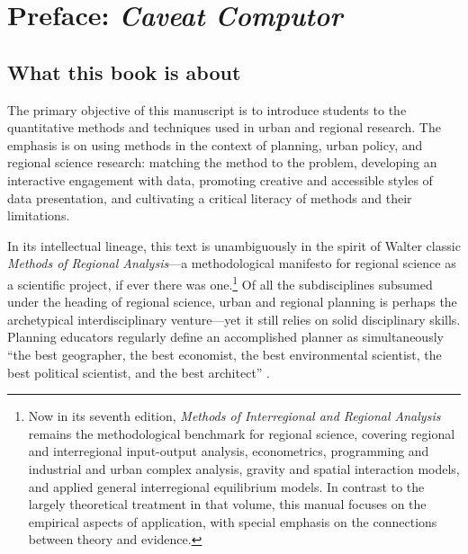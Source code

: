 
\chapter*{Preface: \textit{Caveat Computor}}\label{chap_Preface}

\section*{What this book is about}

The primary objective of this manuscript is to introduce students to the
quantitative methods and techniques used in urban and regional research. The
emphasis is on using methods in the context of planning, urban policy, and
regional science research: matching the method to the problem, developing an
interactive engagement with data, promoting creative and accessible styles of
data presentation, and cultivating a critical literacy of methods and their
limitations.

In its intellectual lineage, this text is unambiguously in the spirit of
Walter  classic \emph{Methods of Regional Analysis}---a
methodological manifesto for regional science as a scientific project, if ever
there was one.\footnote{Now in its seventh edition, \emph{Methods of
Interregional and Regional Analysis} \citep{Isard1998} remains the
methodological benchmark for regional science, covering regional and
interregional input-output analysis, econometrics, programming and industrial
and urban complex analysis, gravity and spatial interaction models, and applied
general interregional equilibrium models. In contrast to the largely
theoretical treatment in that volume, this manual focuses on the empirical
aspects of application, with special emphasis on the connections between theory
and evidence.} Of all the subdisciplines subsumed under the heading of
regional science, urban and regional planning is perhaps the archetypical
interdisciplinary venture---yet it still relies on solid disciplinary
skills. Planning educators regularly define an accomplished planner as
simultaneously ``the best geographer, the best economist, the best
environmental scientist, the best political scientist, and the best
architect'' \citep{Fainstein2011}.

